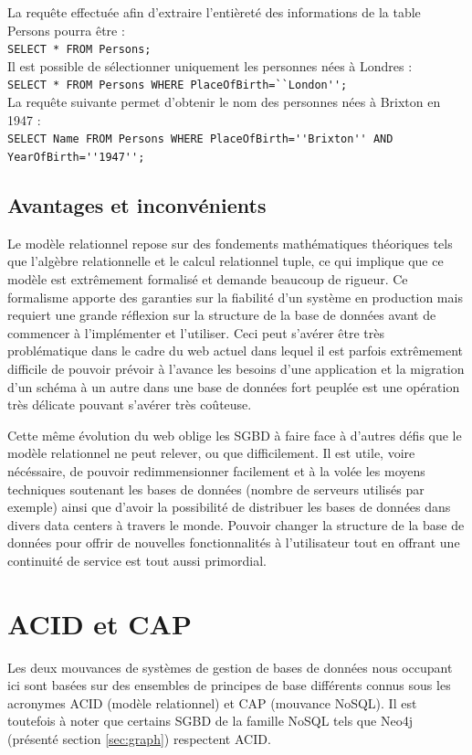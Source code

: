 \documentclass[11pt]{article}
\begin{document}
La requête effectuée afin d'extraire l'entièreté des informations de la table Persons pourra être : \\
\verb|SELECT * FROM Persons;| \\
Il est possible de sélectionner uniquement les personnes nées à Londres : \\
\verb|SELECT * FROM Persons WHERE PlaceOfBirth=``London'';| \\
La requête suivante permet d'obtenir le nom des personnes nées à Brixton en 1947 : \\
\verb|SELECT Name FROM Persons WHERE PlaceOfBirth=''Brixton'' AND YearOfBirth=''1947'';|
\subsection{Avantages et inconvénients}
Le modèle relationnel repose sur des fondements mathématiques théoriques tels que l'algèbre relationnelle et le calcul relationnel tuple, ce qui implique que ce modèle est extrêmement formalisé et demande beaucoup de rigueur. Ce formalisme apporte des garanties sur la fiabilité d'un système en production mais requiert une grande réflexion sur la structure de la base de données avant de commencer à l'implémenter et l'utiliser. Ceci peut s'avérer être très problématique dans le cadre du web actuel dans lequel il est parfois extrêmement difficile de pouvoir prévoir à l'avance les besoins d'une application et la migration d'un schéma à un autre dans une base de données fort peuplée est une opération très délicate pouvant s'avérer très coûteuse.

Cette même évolution du web oblige les SGBD à faire face à d'autres défis que le modèle relationnel ne peut relever, ou que difficilement. Il est utile, voire nécéssaire, de pouvoir redimmensionner facilement et à la volée les moyens techniques soutenant les bases de données (nombre de serveurs utilisés par exemple) ainsi que d'avoir la possibilité de distribuer les bases de données dans divers data centers à travers le monde. Pouvoir changer la structure de la base de données pour offrir de nouvelles fonctionnalités à l'utilisateur tout en offrant une continuité de service est tout aussi primordial.

\section{ACID et CAP}
Les deux mouvances de systèmes de gestion de bases de données nous occupant ici sont basées sur des ensembles de principes de base différents connus sous les acronymes ACID (modèle relationnel) et CAP (mouvance NoSQL). Il est toutefois à noter que certains SGBD de la famille NoSQL tels que Neo4j (présenté section \ref{sec:graph}) respectent ACID.
\end{document}
